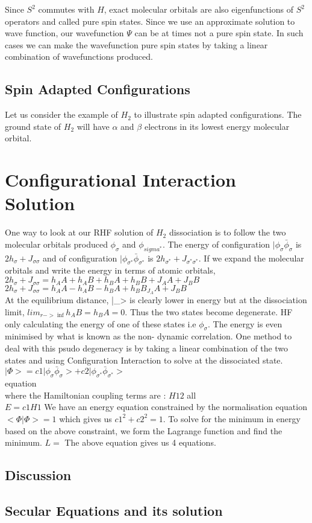 \documentclass[11pt]{article}   	%
\begin{document}
	Since $S^2$ commutes with $H$, exact molecular orbitals are also eigenfunctions of $S^2$ operators and called pure spin states. Since we use an approximate solution
	to wave function, our wavefunction $\Psi$ can be at times not a pure spin state. In such cases we can make the wavefunction pure spin states by taking a linear combination
	of wavefunctions produced. 
	\subsection{Spin Adapted Configurations}
	Let us consider the example of $H_2$ to illustrate spin adapted configurations. The ground state of $H_2$ will have $\alpha$ and $\beta$ electrons in its lowest energy 
	molecular orbital. 
\section{Configurational Interaction Solution}
	One way to look at our RHF solution of $H_2$ dissociation is to follow the two molecular orbitals produced $\phi_{\sigma}$ and $\phi_{sigma^*}$. 
	The energy of configuration $|\phi_{\sigma} \bar{\phi}_{\sigma}$ is $2h_{\sigma} +J_{\sigma \sigma}$ and of configuration $|\phi_{\sigma^*} \bar{\phi}_{\sigma^*}$ is $2h_{\sigma^*} +J_{\sigma^* \sigma^*}$. If we expand the molecular orbitals and write the energy in terms of atomic orbitals, \\
	$2h_{\sigma} +J_{\sigma \sigma}=h_AA+h_AB+h_BA+h_BB+J_AA+J_BB$\\
	$2h_{\sigma} +J_{\sigma \sigma}=h_AA-h_AB-h_BA+h_BB_J_AA+J_BB$\\
	At the equilibrium distance, |\phi_{\sigma}> is clearly lower in energy but at the dissociation limit, $lim_{r->\inf} h_AB=h_BA=0$. Thus the two states
	become degenerate. HF only calculating the energy of one of these states i.e $\phi_{\sigma}$. The energy is even minimised by what is known as the non-
	dynamic correlation. One method to deal with this psudo degeneracy is by taking a linear combination of the two states and using Configuration Interaction 
	to solve at the dissociated state. \\
	$|\Phi>=c1 |\phi_{\sigma}\bar{\phi}_{\sigma}>+c2|\phi_{\sigma^*}\bar{\phi}_{\sigma^*}>$\\
	\matrix{}{}{} equation\\
	where the Hamiltonian coupling terms are :
	$H12$ all \\
	$E=c1H1$
	We have an energy equation constrained by the normalisation equation $<\Phi|\Phi>=1$ which gives us $c1^2+c2^2=1$.
	To solve for the minimum in energy based on the above constraint, we form the Lagrange function and find the minimum. 
	$L=$
	The above equation gives us 4 equations.
	\subsection{Discussion}
	\subsection{Secular Equations and its solution}
\end{document}
